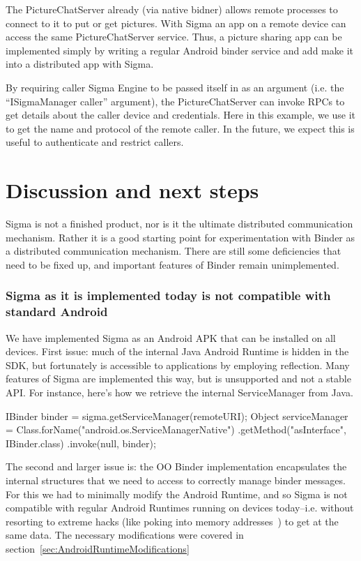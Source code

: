 \documentclass[prodmode]{acmlarge}
\begin{document}
The PictureChatServer already (via native bidner) allows remote processes to connect to it to put or get pictures. With Sigma an app on a remote device can access the same PictureChatServer service. Thus, a picture sharing app can be implemented simply by writing a regular Android binder service and add make it into a distributed app with Sigma.

By requiring caller Sigma Engine to be passed itself in as an argument (i.e. the ``ISigmaManager caller'' argument), the PictureChatServer can invoke RPCs to get details about the caller device and credentials. Here in this example, we use it to get the name and protocol of the remote caller. In the future, we expect this is useful to authenticate and restrict callers.

\section{Discussion and next steps}
\label{sec:Discussion}
Sigma is not a finished product, nor is it the ultimate distributed communication mechanism. Rather it is a good starting point for experimentation with Binder as a distributed communication mechanism. There are still some deficiencies that need to be fixed up, and important features of Binder remain unimplemented.

\subsubsection{Sigma as it is implemented today is not compatible with standard Android}
We have implemented Sigma as an Android APK that can be installed on all devices. First issue: much of the internal Java Android Runtime is hidden in the SDK, but fortunately is accessible to applications by employing reflection. Many features of Sigma are implemented this way, but is unsupported and not a stable API. For instance, here's how we retrieve the internal ServiceManager from Java.

\begin{snippet}
IBinder binder = sigma.getServiceManager(remoteURI);
Object serviceManager = Class.forName("android.os.ServiceManagerNative")
                    .getMethod("asInterface", IBinder.class)
                    .invoke(null, binder);
\end{snippet}

The second and larger issue is: the OO Binder implementation encapsulates the internal structures that we need to access to correctly manage binder messages. For this we had to minimally modify the Android Runtime, and so Sigma is not compatible with regular Android Runtimes running on devices today--i.e. without resorting to extreme hacks (like poking into memory addresses~\cite{FacebookDalvikHacks}) to get at the same data. The necessary modifications were covered in section~\ref{sec:AndroidRuntimeModifications}
\end{document}
